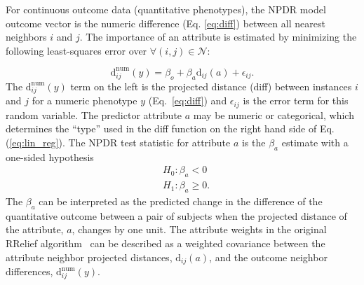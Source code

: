 \documentclass{bioinfo}
\begin{document}
For continuous outcome data (quantitative phenotypes), the NPDR model outcome vector is the numeric difference (Eq. \ref{eq:diff}) between all nearest neighbors $i$ and $j$.
The importance of an attribute is estimated by minimizing the following least-squares error over $\forall(i,j) \in \mathcal{N}$: 


%
%
\begin{equation}\label{eq:lin_reg}
    \text{d}^{\text{num}}_{ij}(y) = \beta_{o} + \beta_{a} \text{d}_{ij}(a) + \epsilon_{ij}.
\end{equation}
The $\text{d}^{\text{num}}_{ij}(y)$ term on the left is the projected distance (diff) between instances $i$ and $j$ for a numeric phenotype $y$ (Eq.~\ref{eq:diff}) and $\epsilon_{ij}$ is the error term for this random variable.
The predictor attribute $a$ may be numeric or categorical, which determines the ``type'' used in the diff function on the right hand side of Eq.(\ref{eq:lin_reg}).
The NPDR test statistic for attribute $a$ is the $\beta_a$ estimate with a one-sided hypothesis
\begin{equation}\label{eq:linreg_null}
\begin{aligned}
    & H_0: \beta_a < 0 \\
    & H_1: \beta_a \ge 0.
\end{aligned}
\end{equation}
The $\beta_a$ can be interpreted as the predicted change in the difference of the quantitative outcome between a pair of subjects when the projected distance of the attribute, $a$, changes by one unit.
The attribute weights in the original RRelief algorithm~\citep{robnik03} can be described as a weighted covariance between the attribute neighbor projected distances, $\text{d}_{ij}(a)$, and the outcome neighbor differences, $\text{d}^{\text{num}}_{ij}(y)$.
\end{document}
